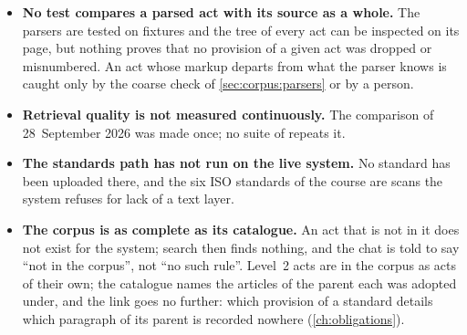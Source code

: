 \begin{itemize}
  \item \textbf{No test compares a parsed act with its source as a whole.} The parsers are
    tested on fixtures and the tree of every act can be inspected on its page, but nothing
    proves that no provision of a given act was dropped or misnumbered. An act whose markup
    departs from what the parser knows is caught only by the coarse check of
    \cref{sec:corpus:parsers} or by a person.
  \item \textbf{Retrieval quality is not measured continuously.} The comparison of
    28~September 2026 was made once; no suite of  repeats it.
  \item \textbf{The standards path has not run on the live system.} No standard has been
    uploaded there, and the six ISO standards of the course are scans the system refuses for
    lack of a text layer.
  \item \textbf{The corpus is as complete as its catalogue.} An act that is not in it does not
    exist for the system; search then finds nothing, and the chat is told to say
    \enquote{not in the corpus}, not \enquote{no such rule}. Level~2 acts are in the corpus as
    acts of their own; the catalogue names the articles of the parent each was adopted under,
    and the link goes no further: which provision of a standard details which paragraph of
    its parent is recorded nowhere (\cref{ch:obligations}).
\end{itemize}
